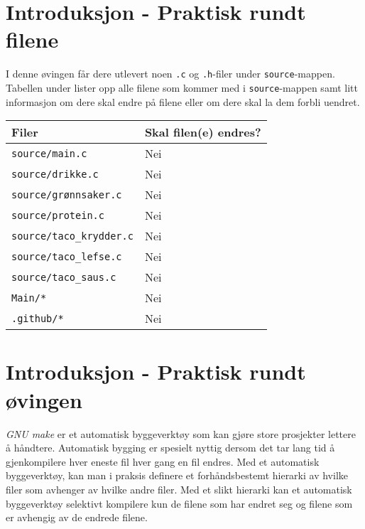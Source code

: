 \begin{alphasection}

\section{Introduksjon - Praktisk rundt filene}

I denne øvingen får dere utlevert noen \verb|.c| og \verb|.h|-filer under \verb|source|-mappen. Tabellen under lister opp alle filene som kommer med i \verb|source|-mappen samt litt informasjon om dere skal endre på filene eller om dere skal la dem forbli uendret.

\begin{center}
 \begin{tabular}{|p{8.5cm} p{5.5cm}|} 
 \hline
 \textbf{Filer} & \textbf{Skal filen(e) endres?}  \\ [0.5ex] 
 \hline\hline
  \verb|source/main.c| & Nei  \\ 
 \hline
 \verb|source/drikke.c| & Nei  \\ 
 \hline
 \verb|source/grønnsaker.c| & Nei  \\ 
 \hline
 \verb|source/protein.c| & Nei  \\ 
 \hline
 \verb|source/taco_krydder.c| & Nei  \\
 \hline
 \verb|source/taco_lefse.c| & Nei  \\ 
 \hline
  \verb|source/taco_saus.c| & Nei  \\ 
 \hline
   \verb|Main/*| & Nei  \\ 
 \hline
  \verb|.github/*| & Nei \\
 \hline 
\end{tabular}
\end{center}

\section{Introduksjon - Praktisk rundt øvingen}

 \textit{GNU make} er et automatisk byggeverktøy som kan gjøre store prosjekter lettere å håndtere. Automatisk bygging er spesielt nyttig dersom det tar lang tid å gjenkompilere hver eneste fil hver gang en fil endres. Med et automatisk byggeverktøy, kan man i praksis definere et forhåndsbestemt hierarki av hvilke filer som avhenger av hvilke andre filer. Med et slikt hierarki kan et automatisk byggeverktøy selektivt kompilere kun de filene som har endret seg og filene som er avhengig av de endrede filene.
 

\end{alphasection}
